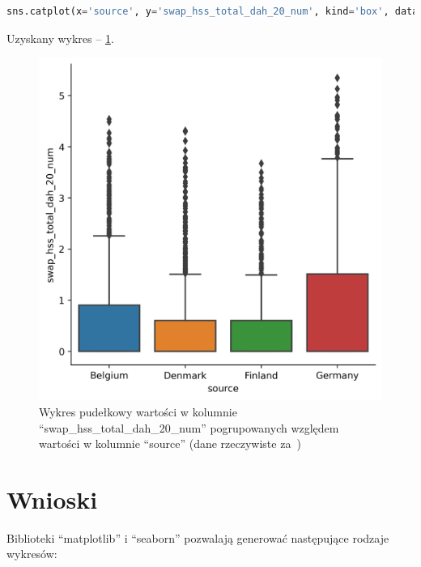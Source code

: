 \documentclass[11pt]{report}
\begin{document}
\begin{lstlisting}[language=Python]
sns.catplot(x='source', y='swap_hss_total_dah_20_num', kind='box', data=data)
\end{lstlisting}

Uzyskany wykres -- \ref{fig:wykres21}.

\begin{figure}[h]
    \caption{Wykres pudełkowy wartości w kolumnie \enquote{swap\_hss\_total\_dah\_20\_num} pogrupowanych względem wartości w kolumnie \enquote{source} (dane rzeczywiste za~\cite{daneMedyczne})}
    \label{fig:wykres21}
    \centering
    \includegraphics[width=.8\textwidth]{wykres22}
\end{figure}

\chapter*{Wnioski}

Biblioteki \enquote{matplotlib} i \enquote{seaborn} pozwalają generować następujące rodzaje wykresów:
\end{document}
